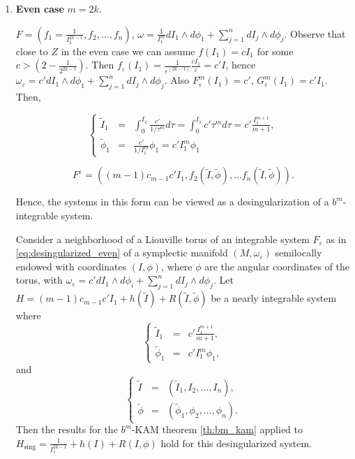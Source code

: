 \begin{enumerate}
\item \textbf{Even case} $m = 2k$.

$F=(f_1 = \frac{1}{I_1^{2k-1}},f_2 ,\ldots, f_n)$, $\omega = \frac{1}{I_1^m} d I_1 \wedge d\phi_1 + \sum_{j=1}^n dI_j \wedge d\phi_j$.
Observe that close to $Z$ in the even case we can assume $f(I_1) = c I_1$ for some $c > (2 -\frac{1}{2^{2k-1}})$. Then $f_\varepsilon(I_1) = \frac{1}{\varepsilon^{(2k-1)}}\frac{c I_1}{\varepsilon}= c' I$, hence $\omega_\varepsilon = c' dI_1\wedge d\phi_1 + \sum_{j=1}^n dI_j \wedge d\phi_j$. Also $F_\varepsilon^m(I_1) = c'$, $G_\varepsilon^m(I_1) = c' I_1$.
Then,

$$
\left\{
\begin{array}{rcl}
\tilde I_1 & = & \int_0^{I_1}\frac{c'}{1/\tau^m}d \tau = \int_0^{I_1} c' \tau^m d\tau = c'\frac{I_1^{m+1}}{m+1},\\
\tilde \phi_1 & = & \frac{c'}{1/I_1^m}\phi_1 = c' I_1^m \phi_1
\end{array}
\right.
$$

\begin{equation}\label{eq:desingularized_even}
F^\varepsilon = ((m-1)c_{m-1}c' I_1, f_2(\tilde I, \tilde \phi), \ldots f_n(\tilde I, \tilde \phi)).
\end{equation}

Hence, the systems in this form can be viewed as a desingularization of a $b^m$-integrable system.

\begin{theoremD}
Consider a neighborhood of a Liouville torus of an integrable system $F_\varepsilon$ as in \ref{eq:desingularized_even} of a symplectic manifold $(M, \omega_\varepsilon)$ semilocally endowed with coordinates $(I,\phi)$, where $\phi$ are the angular coordinates of the torus, with $\omega_\varepsilon = c' dI_1 \wedge d\phi_i + \sum_{j= 1}^n dI_j\wedge d\phi_j$. Let $H=(m-1)c_{m-1}c' I_1 + h(\tilde I) + R(\tilde I,\tilde \phi)$ be a nearly integrable system where
$$
\left\{
\begin{array}{rcl}
\tilde I_1 & = & c'\frac{I_1^{m+1}}{m+1},\\
\tilde \phi_1 & = & c' I_1^m \phi_1 ,
\end{array}
\right.
$$
and
$$
\left\{
\begin{array}{rcl}
\tilde I & = & (\tilde I_1, I_2, \ldots, I_n),\\
\tilde \phi & = & (\tilde \phi_1, \phi_2, \ldots, \phi_n).
\end{array}
\right.
$$
Then the results for the $b^m$-KAM theorem \ref{th:bm_kam} applied to $H_{\text{sing}} = \frac{1}{I_1^{2k-1}} + h(I) + R(I,\phi)$ hold for this desingularized system.
\end{theoremD}


\end{enumerate}
